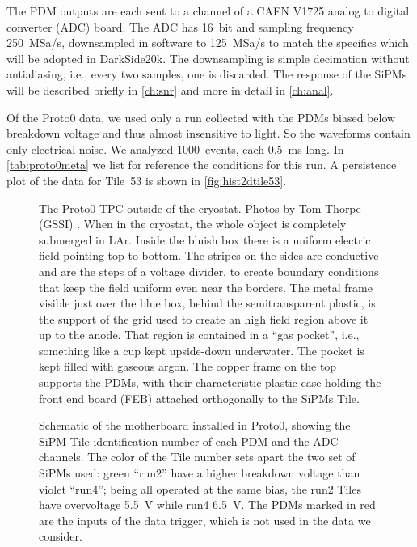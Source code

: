 The PDM outputs are each sent to a channel of a CAEN V1725 analog to digital
converter (ADC) board. The ADC has \SI{16}{bit} and sampling frequency
\SI{250}{MSa/s}, downsampled in software to \SI{125}{MSa/s} to match the
specifics which will be adopted in DarkSide20k. The downsampling is simple
decimation without antialiasing, i.e., every two samples, one is discarded. The
response of the SiPMs will be described briefly in \autoref{ch:snr} and more in
detail in \autoref{ch:anal}.

Of the Proto0 data, we used only a run collected with the PDMs biased below
breakdown voltage and thus almost insensitive to light. So the waveforms
contain only electrical noise. We analyzed 1000~events, each \SI{0.5}{ms} long.
In \autoref{tab:proto0meta} we list for reference the conditions for this run.
A persistence plot of the data for Tile~53 is shown in
\autoref{fig:hist2dtile53}.

\begin{figure}
    
    
    \caption{\label{fig:proto0} The Proto0 TPC outside of the cryostat. Photos
    by Tom Thorpe (GSSI) \cite{proto0photos}. When in the cryostat, the whole
    object is completely submerged in LAr. Inside the bluish box there is a
    uniform electric field pointing top to bottom. The stripes on the sides are
    conductive and are the steps of a voltage divider, to create boundary
    conditions that keep the field uniform even near the borders. The metal
    frame visible just over the blue box, behind the semitransparent plastic,
    is the support of the grid used to create an high field region above it up
    to the anode. That region is contained in a ``gas pocket'', i.e., something
    like a cup kept upside-down underwater. The pocket is kept filled with
    gaseous argon. The copper frame on the top supports the PDMs, with their
    characteristic plastic case holding the front end board (FEB) attached
    orthogonally to the SiPMs Tile.}
    
\end{figure}

\begin{figure}
    
    
    \caption{\label{fig:pdmadcch} Schematic of the motherboard installed in
    Proto0, showing the SiPM Tile identification number of each PDM and the ADC
    channels. The color of the Tile number sets apart the two set of SiPMs
    used: green ``run2'' have a higher breakdown voltage than violet ``run4'';
    being all operated at the same bias, the run2 Tiles have overvoltage
    \SI{5.5}{V} while run4 \SI{6.5}{V}. The PDMs marked in red are the inputs
    of the data trigger, which is not used in the data we consider.}

\end{figure}

